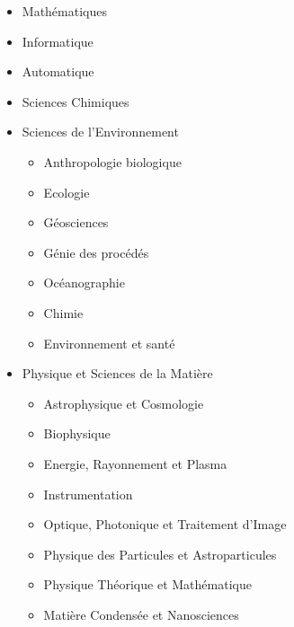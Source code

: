 	\label{ed-184-mathematiques-et-informatique}

		\begin{itemize}
		\item Mathématiques
		\item Informatique
		\item Automatique
		\end{itemize}

	\label{ed-250-sciences-chimiques-de-marseille}

		\begin{itemize}
		\item Sciences Chimiques
		\end{itemize}

	\label{ed-251-sciences-de-lenvironnement}

		\begin{itemize}
		\item Sciences de l'Environnement
			\begin{itemize}
			\item Anthropologie biologique
			\item Ecologie
			\item Géosciences 
			\item Génie des procédés
			\item Océanographie
			\item Chimie 
			\item Environnement et santé 
			\end{itemize}
		\end{itemize}

	\label{ed-352-physique-et-sciences-de-la-matiere}

		\begin{itemize}
		\item Physique et Sciences de la Matière 
			\begin{itemize}
			\item Astrophysique et Cosmologie
			\item Biophysique
			\item Energie, Rayonnement et Plasma
			\item Instrumentation
			\item Optique, Photonique et Traitement d'Image
			\item Physique des Particules et Astroparticules
			\item Physique Théorique et Mathématique
			\item Matière Condensée et Nanosciences 
			\end{itemize}
		\end{itemize}

